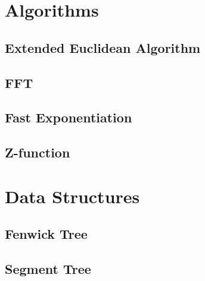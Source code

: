 \documentclass[12pt]{article}
\begin{document}
\tableofcontents

%
% 
%
% 

\section{Algorithms}

\subsection{Extended Euclidean Algorithm} 
\subsection{FFT} 
\subsection{Fast Exponentiation} 
\subsection{Z-function} 

\section{Data Structures}

\subsection{Fenwick Tree} 
\subsection{Segment Tree} 
\end{document}
